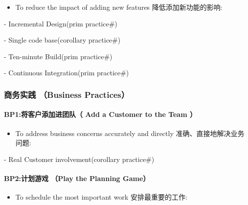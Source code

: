 \begin{itemize}
\tightlist
\item
  To reduce the impact of adding new features 降低添加新功能的影响:
\end{itemize}

\begin{description}
\tightlist
\item[]
- Incremental Design(prim practice\#)

- Single code base(corollary practice\#)

- Ten-minute Build(prim practice\#)

- Continuous Integration(prim practice\#)
\end{description}

\hypertarget{ux5546ux52a1ux5b9eux8df5-business-practices}{%
\subsubsection{商务实践 （Business
Practices）}\label{ux5546ux52a1ux5b9eux8df5-business-practices}}

\hypertarget{bp1ux5c06ux5ba2ux6237ux6dfbux52a0ux8fdbux56e2ux961f-add-a-customer-to-the-team}{%
\paragraph{BP1:将客户添加进团队（ Add a Customer to the Team
）}\label{bp1ux5c06ux5ba2ux6237ux6dfbux52a0ux8fdbux56e2ux961f-add-a-customer-to-the-team}}

\begin{itemize}
\tightlist
\item
  To address business concerns accurately and directly
  准确、直接地解决业务问题:
\end{itemize}

\begin{description}
\tightlist
\item[]
- Real Customer involvement(corollary practice\#)
\end{description}

\hypertarget{bp2ux8ba1ux5212ux6e38ux620f-play-the-planning-game}{%
\paragraph{BP2:计划游戏 （Play the Planning
Game）}\label{bp2ux8ba1ux5212ux6e38ux620f-play-the-planning-game}}

\begin{itemize}
\tightlist
\item
  To schedule the most important work 安排最重要的工作:\\
\end{itemize}

